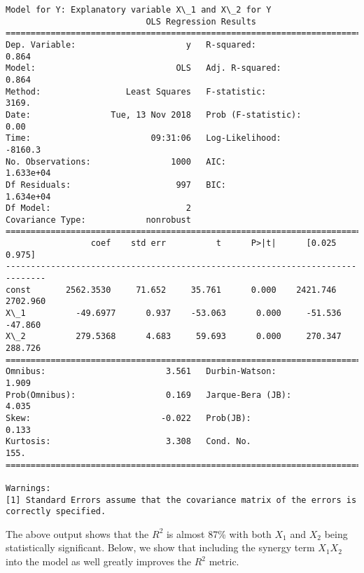 \documentclass[11pt]{article}
\begin{document}
    \begin{Verbatim}[commandchars=\\\{\}]
Model for Y: Explanatory variable X\_1 and X\_2 for Y
                            OLS Regression Results                            
==============================================================================
Dep. Variable:                      y   R-squared:                       0.864
Model:                            OLS   Adj. R-squared:                  0.864
Method:                 Least Squares   F-statistic:                     3169.
Date:                Tue, 13 Nov 2018   Prob (F-statistic):               0.00
Time:                        09:31:06   Log-Likelihood:                -8160.3
No. Observations:                1000   AIC:                         1.633e+04
Df Residuals:                     997   BIC:                         1.634e+04
Df Model:                           2                                         
Covariance Type:            nonrobust                                         
==============================================================================
                 coef    std err          t      P>|t|      [0.025      0.975]
------------------------------------------------------------------------------
const       2562.3530     71.652     35.761      0.000    2421.746    2702.960
X\_1          -49.6977      0.937    -53.063      0.000     -51.536     -47.860
X\_2          279.5368      4.683     59.693      0.000     270.347     288.726
==============================================================================
Omnibus:                        3.561   Durbin-Watson:                   1.909
Prob(Omnibus):                  0.169   Jarque-Bera (JB):                4.035
Skew:                          -0.022   Prob(JB):                        0.133
Kurtosis:                       3.308   Cond. No.                         155.
==============================================================================

Warnings:
[1] Standard Errors assume that the covariance matrix of the errors is correctly specified.

    \end{Verbatim}

    The above output shows that the \(R^2\) is almost 87\% with both \(X_1\)
and \(X_2\) being statistically significant. Below, we show that
including the synergy term \(X_1 X_2\) into the model as well greatly
improves the \(R^2\) metric.
\end{document}
